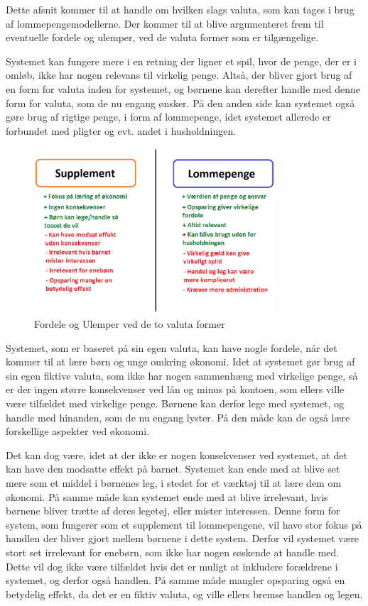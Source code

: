 Dette afsnit kommer til at handle om hvilken slags valuta, som kan tages i brug af lommepengemodellerne. Der kommer til at blive argumenteret frem til eventuelle fordele og ulemper, ved de valuta former som er tilgængelige.

Systemet kan fungere mere i en retning der ligner et spil, hvor de penge, der er i omløb, ikke har nogen relevans til virkelig penge. Altså, der bliver gjort brug af en form for valuta inden for systemet, og børnene kan derefter handle med denne form for valuta, som de nu engang ønsker. På den anden side kan systemet også gøre brug af rigtige penge, i form af lommepenge, idet systemet allerede er forbundet med pligter og evt. andet i husholdningen.

\begin{figure}[htb]
\centering
\includegraphics[width=0.8\textwidth]{Billeder/supplomme.png}
\caption{Fordele og Ulemper ved de to valuta former}
\label{SuppLomme}
\end{figure}

Systemet, som er baseret på sin egen valuta, kan have nogle fordele, når det kommer til at lære børn og unge omkring økonomi. Idet at systemet gør brug af sin egen fiktive valuta, som ikke har nogen sammenhæng med virkelige penge, så er der ingen større konsekvenser ved lån og minus på kontoen, som ellers ville være tilfældet med virkelige penge. Børnene kan derfor lege med systemet, og handle med hinanden, som de nu engang lyster. På den måde kan de også lære forskellige aspekter ved økonomi.

Det kan dog være, idet at der ikke er nogen konsekvenser ved systemet, at det kan have den modsatte effekt på barnet.  Systemet kan ende med at blive set mere som et middel i børnenes leg, i stedet for et værktøj til at lære dem om økonomi. På samme måde kan systemet ende med at blive irrelevant, hvis børnene bliver trætte af deres legetøj, eller mister interessen. Denne form for system, som fungerer som et supplement til lommepengene, vil have stor fokus på handlen der bliver gjort mellem børnene i dette system. Derfor vil systemet være stort set irrelevant for enebørn, som ikke har nogen søskende at handle med. Dette vil dog ikke være tilfældet hvis det er muligt at inkludere forældrene i systemet, og derfor også handlen. På samme måde mangler opsparing også en betydelig effekt, da det er en fiktiv valuta, og ville ellers bremse handlen og legen.
 
